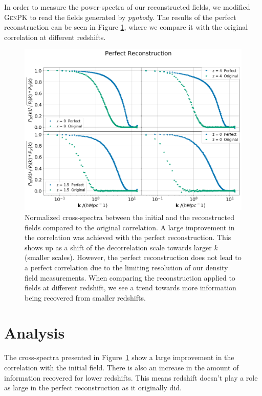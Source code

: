
In order to measure the power-spectra of our reconstructed fields, we modified \textsc{GenPK} to read the fields generated by \textit{pynbody}. The results of the perfect reconstruction can be seen in Figure \ref{fig:3.2}, where we compare it with the original correlation at different redshifts. 

\begin{figure}
    \centering
    \includegraphics[width=1\columnwidth]{images/perfRecon/perfRecon.png}%
    
    \caption{
    Normalized cross-spectra between the initial and the reconstructed fields compared to the original correlation. A large improvement in the correlation was achieved with the perfect reconstruction. This shows up as a shift of the decorrelation scale towards larger $k$ (smaller scales). However, the perfect reconstruction does not lead to a perfect correlation due to the limiting resolution of our density field measurements. When comparing the reconstruction applied to fields at different redshift, we see a trend towards more information being recovered from smaller redshifts.
    }
    
    \label{fig:3.2}
\end{figure}

\section{Analysis}

The cross-spectra presented in Figure~\ref{fig:3.2} show a large improvement in the correlation with the initial field. There is also an increase in the amount of information recovered for lower redshifts. This means redshift doesn't play a role as large in the perfect reconstruction as it originally did. 

